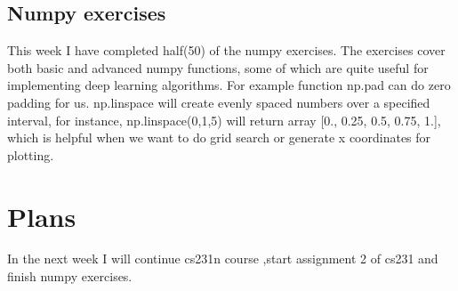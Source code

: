 \documentclass{article} %
\begin{document}
\subsection{Numpy exercises}
This week I have completed half(50) of the numpy exercises. The exercises cover both basic and advanced numpy functions, some of which are quite useful for implementing deep learning algorithms. For example function np.pad can do zero padding for us. np.linspace will create evenly spaced numbers over a specified interval, for instance, np.linspace(0,1,5) will return array [0., 0.25, 0.5, 0.75, 1.], which is helpful when we want to do grid search or generate x coordinates for plotting.

\section{Plans}
In the next week I will continue cs231n course ,start assignment 2 of cs231 and finish numpy exercises.
\end{document}
